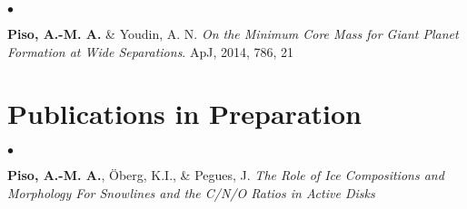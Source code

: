 \documentclass[margin,line]{res}
\newenvironment{list1}{
  \begin{list}{\ding{113}}{%
      \setlength{\itemsep}{0in}
      \setlength{\parsep}{0in} \setlength{\parskip}{0in}
      \setlength{\topsep}{0in} \setlength{\partopsep}{0in} 
      \setlength{\leftmargin}{0.17in}}}{\end{list}}
\newenvironment{list2}{
  \begin{list}{$\bullet$}{%
      \setlength{\itemsep}{0in}
      \setlength{\parsep}{0in} \setlength{\parskip}{0in}
      \setlength{\topsep}{0in} \setlength{\partopsep}{0in} 
      \setlength{\leftmargin}{0.2in}}}{\end{list}}
\begin{document}
\begin{resume}
\begin{list2}
\item[] {\bf Piso, A.-M. A.} \& Youdin, A. N. \textit{On the Minimum Core Mass for Giant Planet Formation at Wide Separations}. ApJ, 2014, 786, 21 \\
\end{list2}

\section{\sc Publications in Preparation}


\begin{list2}
\item[] {\bf Piso, A.-M. A.}, \"Oberg, K.I., \& Pegues, J. \textit{The Role of Ice Compositions and Morphology For Snowlines and the C/N/O Ratios in Active Disks} \\
\end{list2}




%


\end{resume}
\end{document}
